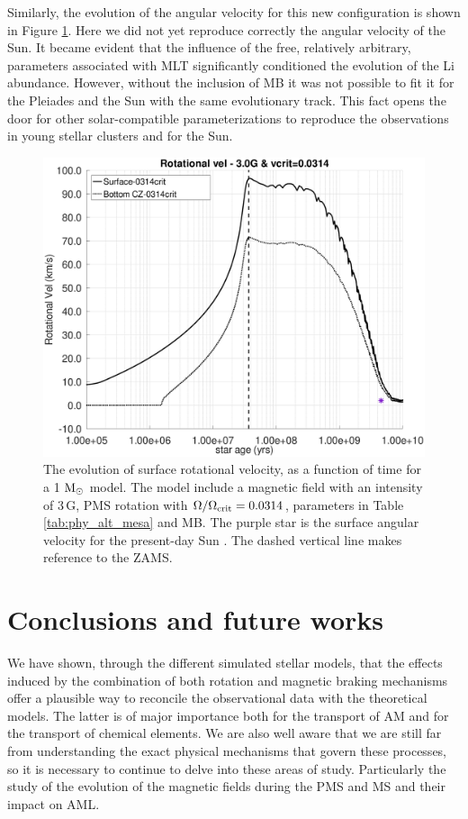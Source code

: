 \documentclass[fleqn,usenatbib]{mnras}
\begin{document}
Similarly, the evolution of the angular velocity for this new configuration is shown in Figure \ref{fig:rot_vel_var_vel_mlt_3_0g}. Here we did not yet reproduce correctly the angular velocity of the Sun. It became evident that the influence of the free, relatively arbitrary, parameters associated with MLT significantly conditioned the evolution of the Li abundance. However, without the inclusion of MB it was not possible to fit it for the Pleiades and the Sun with the same evolutionary track. This fact opens the door for other solar-compatible parameterizations to reproduce the observations in young stellar clusters and for the Sun. \par

\begin{figure}
	\includegraphics[trim = 10mm 10mm 15mm 10mm, clip,width=\columnwidth]{figures/rot_vel_3_0g_0314vc.eps}
    \caption{The evolution of surface rotational velocity, as a function of time for a 1 $\mathrm{M}_\odot$ model. The model include a magnetic field with an intensity of 3\,G, PMS rotation with $\Omega / \Omega_{\mathrm{crit}}=0.0314$, parameters in Table \ref{tab:phy_alt_mesa} and MB. The purple star is the surface angular velocity for the present-day Sun \citep{Gill2012}. The dashed vertical line makes reference to the ZAMS.}
    \label{fig:rot_vel_var_vel_mlt_3_0g}
\end{figure}


\section{Conclusions and future works} \label{sec_conclusions}
We have shown, through the different simulated stellar models, that the effects induced by the combination of both rotation and magnetic braking mechanisms offer a plausible way to reconcile the observational data with the theoretical models. The latter is of major importance both for the transport of AM and for the transport of chemical elements. We are also well aware that we are still far from understanding the exact physical mechanisms that govern these processes, so it is necessary to continue to delve into these areas of study. Particularly the study of the evolution of the magnetic fields during the PMS and MS and their impact on AML. \par
\end{document}
